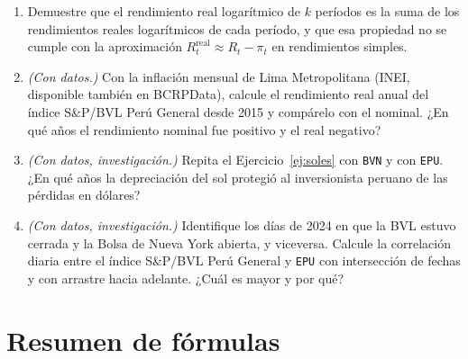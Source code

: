 \begin{enumerate}[label=\textbf{\thechapter.\arabic*},leftmargin=*,itemsep=6pt]
  \item Demuestre que el rendimiento real logarítmico de $k$ períodos es la suma de los rendimientos
  reales logarítmicos de cada período, y que esa propiedad no se cumple con la aproximación
  $R^{\mathrm{real}}_t\approx R_t-\pi_t$ en rendimientos simples.

  \item \emph{(Con datos.)} Con la inflación mensual de Lima Metropolitana (INEI, disponible también en
  BCRPData), calcule el rendimiento real anual del índice S\&P/BVL Perú General desde 2015 y compárelo
  con el nominal. ¿En qué años el rendimiento nominal fue positivo y el real negativo?

  \item \emph{(Con datos, investigación.)} Repita el Ejercicio~\ref{ej:soles} con \texttt{BVN} y con
  \texttt{EPU}. ¿En qué años la depreciación del sol protegió al inversionista peruano de las pérdidas en
  dólares?

  \item \emph{(Con datos, investigación.)} Identifique los días de 2024 en que la BVL estuvo cerrada y la
  Bolsa de Nueva York abierta, y viceversa. Calcule la correlación diaria entre el índice S\&P/BVL Perú
  General y \texttt{EPU} con intersección de fechas y con arrastre hacia adelante. ¿Cuál es mayor y por
  qué?
\end{enumerate}

\section{Resumen de fórmulas}

